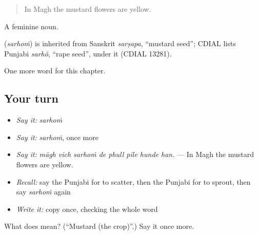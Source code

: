 \begin{quote}
In Magh the mustard flowers are yellow.
\end{quote}

A feminine noun.

\begin{cousinweb}
\textbf{} (\emph{sarhoṁ}) is inherited from Sanskrit \emph{sarṣapa}, \textquotedblleft{}mustard seed\textquotedblright{}; CDIAL lists Punjabi \emph{sarhõ}, \textquotedblleft{}rape seed\textquotedblright{}, under it (CDIAL 13281).
\end{cousinweb}

\begin{grammarlens}[title={What you've built}]
One more word for this chapter.
\end{grammarlens}

\subsection*{Your turn}
\begin{itemize}
\raggedright
  \item \emph{Say it:} \emph{sarhoṁ}
  \item \emph{Say it:} \emph{sarhoṁ}, once more
  \item \emph{Say it:} \emph{māgh vich sarhoṁ de phull pīle hunde han.} — In Magh the mustard flowers are yellow.
  \item \emph{Recall:} say the Punjabi for to scatter, then the Punjabi for to sprout, then say \emph{sarhoṁ} again
  \item \emph{Write it:} copy \textbf{} once, checking the whole word
\end{itemize}

\begin{tcolorbox}[breakable,colback=teal!4,colframe=teal!35!black,title={Before you move on}]
What does  mean? (\textquotedblleft{}Mustard (the crop)\textquotedblright{}.) Say it once more.
\end{tcolorbox}
